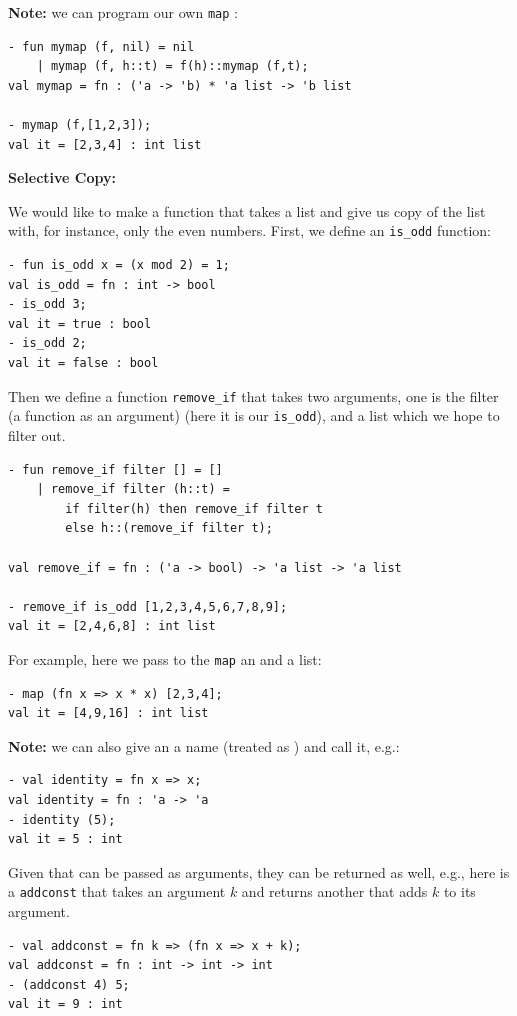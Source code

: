 \textbf{Note: }we can program our own \texttt{map}  :
\begin{verbatim}
- fun mymap (f, nil) = nil
    | mymap (f, h::t) = f(h)::mymap (f,t);
val mymap = fn : ('a -> 'b) * 'a list -> 'b list

- mymap (f,[1,2,3]);
val it = [2,3,4] : int list
\end{verbatim}

\textbf{Selective Copy:}

We would like to make a function that takes a list and give us copy of the list with, for instance, only the even numbers. First, we define an \texttt{is\_odd} function:
\begin{verbatim}
- fun is_odd x = (x mod 2) = 1;
val is_odd = fn : int -> bool
- is_odd 3;
val it = true : bool
- is_odd 2;
val it = false : bool
\end{verbatim}
Then we define a function \texttt{remove\_if} that takes two arguments, one is the filter (a function as an argument) (here it is our \texttt{is\_odd}), and a list which we hope to filter out. 
\begin{verbatim}
- fun remove_if filter [] = []
    | remove_if filter (h::t) =
        if filter(h) then remove_if filter t
        else h::(remove_if filter t);

val remove_if = fn : ('a -> bool) -> 'a list -> 'a list

- remove_if is_odd [1,2,3,4,5,6,7,8,9];
val it = [2,4,6,8] : int list
\end{verbatim}


For example, here we pass to the \texttt{map}  an  and a list:
\begin{verbatim}
- map (fn x => x * x) [2,3,4];
val it = [4,9,16] : int list
\end{verbatim}
\textbf{Note: }we can also give an  a name (treated as ) and call it, e.g.:
\begin{verbatim}
- val identity = fn x => x;
val identity = fn : 'a -> 'a
- identity (5);
val it = 5 : int
\end{verbatim}
Given that  can be passed as arguments, they can be returned as well, e.g., here is a  \texttt{addconst} that takes an argument $k$ and returns another  that adds $k$ to its argument.
\begin{verbatim}
- val addconst = fn k => (fn x => x + k);
val addconst = fn : int -> int -> int
- (addconst 4) 5;
val it = 9 : int
\end{verbatim}

